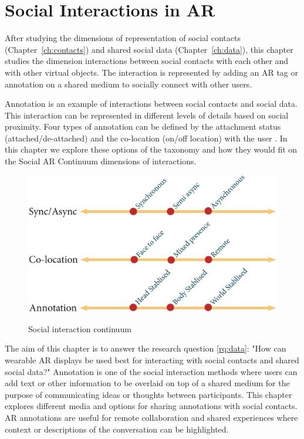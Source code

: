 \chapter{Social Interactions in AR}
\label{ch:annotation}

After studying the dimensions of representation of social contacts (Chapter~\ref{ch:contacts}) and shared social data (Chapter~\ref{ch:data}), this chapter studies the dimension interactions between social contacts with each other and with other virtual objects. The interaction is represented by adding an AR tag or annotation on a shared medium to socially connect with other users.

Annotation is an example of interactions between social contacts and social data. This interaction can be represented in different levels of details based on social proximity. Four types of annotation can be defined by the attachment status (attached/de-attached) and the co-location (on/off location) with the user \cite{Hansen2006}. In this chapter we explore these options of the taxonomy and how they would fit on the Social AR Continuum dimensions of interactions. 

\begin{figure}[h]
  \centering
  \includegraphics[width=\columnwidth]{images/continuum/continuum4.2-05.eps}
  \includegraphics[width=\columnwidth]{images/continuum/continuum4.2-06.eps}
  \includegraphics[width=\columnwidth]{images/continuum/continuum4.2-07.eps}
  \caption{Social interaction continuum}
  \label{fig:interaction:interaction-continuum}
\end{figure}

The aim of this chapter is to answer the research question \ref{rq:data}: "How can wearable AR displays be used best for interacting with social contacts and shared social data?"
Annotation is one of the social interaction methods where users can add text or other information to be overlaid on top of a shared medium for the purpose of communicating ideas or thoughts between participants. This chapter explores different media and options for sharing annotations with social contacts. AR annotations are useful for remote collaboration and shared experiences where context or descriptions of the conversation can be highlighted.

